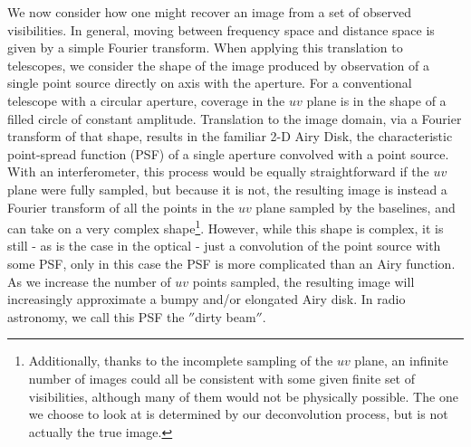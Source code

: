 We now consider how one might recover an image from a set of observed visibilities. In general, moving between frequency space and distance space is given by a simple Fourier transform. When applying this translation to telescopes, we consider the shape of the image produced by observation of a single point source directly on axis with the aperture. For a conventional telescope with a circular aperture, coverage in the $uv$ plane is in the shape of a filled circle of constant amplitude. Translation to the image domain, via a Fourier transform of that shape, results in the familiar 2-D Airy Disk, the characteristic point-spread function (PSF) of a single aperture convolved with a point source. With an interferometer, this process would be equally straightforward if the $uv$ plane were fully sampled, but because it is not, the resulting image is instead a Fourier transform of all the points in the $uv$ plane sampled by the baselines, and can take on a very complex shape\footnote{Additionally, thanks to the incomplete sampling of the $uv$ plane, an infinite number of images could all be consistent with some given finite set of visibilities, although many of them would not be physically possible. The one we choose to look at is determined by our deconvolution process, but is not actually the true image.}. However, while this shape is complex, it is still - as is the case in the optical - just a convolution of the point source with some PSF, only in this case the PSF is more complicated than an Airy function. As we increase the number of $uv$ points sampled, the resulting image will increasingly approximate a bumpy and/or elongated Airy disk. In radio astronomy, we call this PSF the $''$dirty beam$''$.


